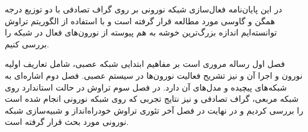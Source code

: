 در این پایان‌نامه فعال‌سازی شبکه نورونی بر روی گراف  تصادفی با دو توزیع درجه همگن و گاوسی مورد مطالعه قرار گرفته است و با استفاده از الگوریتم تراوش توانسته‌ایم اندازه بزرگ‌ترین خوشه به هم پیوسته از نورون‌های فعال در شبکه را بررسی کنیم. 

فصل اول رساله مروری است بر مفاهیم ابتدایی شبکه عصبی، شامل تعاریف اولیه نورون و اجرا آن و نیز تشریح فعالیت نورون‌ها در سیستم عصبی. فصل دوم اشاره‌ای به شبکه‌های پیچیده و مدل‌‌های آن دارد. در فصل سوم تراوش در حالت استاندارد روی شبکه مربعی، گراف تصادفی و  نیز نتایج تجربی که  روی شبکه نورونی  انجام شده است را بررسی کردیم و در نهایت در فصل آخر تئوری  تراوش خودراه‌انداز و شبیه‌سازی شبکه نورونی مورد بحث قرار گرفته است.






